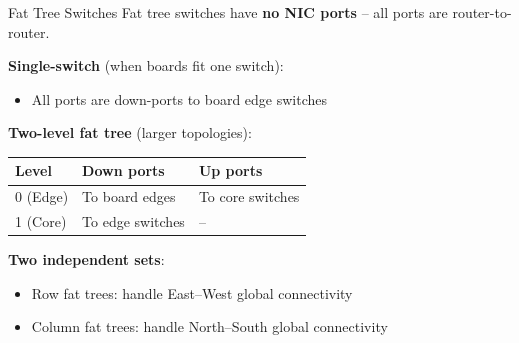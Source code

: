 \documentclass[t]{beamer}
\begin{document}
\begin{frame}{Fat Tree Switches}
    Fat tree switches have \textbf{no NIC ports} -- all ports are router-to-router.

    \vspace{0.3cm}

    \textbf{Single-switch} (when boards fit one switch):
    \begin{itemize}
        \item All ports are down-ports to board edge switches
    \end{itemize}

    \vspace{0.2cm}

    \textbf{Two-level fat tree} (larger topologies):

    \vspace{0.1cm}
    \begin{tabular}{lll}
        \toprule
        \textbf{Level} & \textbf{Down ports} & \textbf{Up ports} \\
        \midrule
        0 (Edge) & To board edges & To core switches \\
        1 (Core) & To edge switches & -- \\
        \bottomrule
    \end{tabular}

    \vspace{0.3cm}

    \textbf{Two independent sets}:
    \begin{itemize}
        \item Row fat trees: handle East--West global connectivity
        \item Column fat trees: handle North--South global connectivity
    \end{itemize}
\end{frame}
\end{document}
